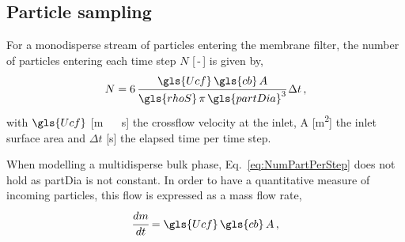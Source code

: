 \subsection{Particle sampling \label{sec:ParSamp}}
For a monodisperse stream of particles entering the membrane filter, the number of particles entering each time step $N$ [\,-\,] is given by,
\begin{equation}
 N=6\, \cfrac{\gls{Ucf}\, \gls{cb}\, A}{\gls{rhoS}\, \pi\, \gls{partDia}^3 }\, \Delta t \, ,
\label{eq:NumPartPerStep}
 \end{equation}
with $\gls{Ucf}$ [\unit{\metre\,\reciprocal\second}] the crossflow velocity at the inlet, \gls{A} [\unit{\metre\squared}] the inlet surface area and $\Delta t$ [\unit{\second}] the elapsed time per time step. \par
When modelling a multidisperse bulk phase, Eq.\ \eqref{eq:NumPartPerStep} does not hold as \gls{partDia} is not constant. In order to have a quantitative measure of incoming particles, this flow is expressed as a mass flow rate, %
\begin{equation}
 \cfrac{dm}{dt} = \gls{Ucf}\, \gls{cb}\, A\, ,
\label{eq:incomMass} 
\end{equation}

